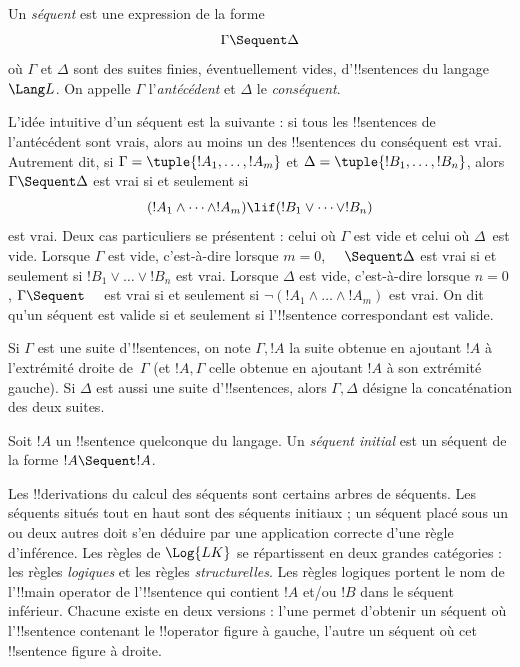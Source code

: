 \documentclass[11pt,a4paper,openany]{memoir}
\begin{document}
\begin{defn}[Séquent]
Un \emph{séquent} est une expression de la forme
\[
\Gamma \Sequent \Delta
\]
où $\Gamma$ et $\Delta$ sont des suites finies, éventuellement vides,
d'!!{sentence}s du langage $\Lang L$. On appelle $\Gamma$
l'\emph{antécédent} et $\Delta$ le \emph{conséquent}.
\end{defn}

\begin{explain}
L'idée intuitive d'un séquent est la suivante : si tous les
!!{sentence}s de l'antécédent sont vrais, alors au moins un des
!!{sentence}s du conséquent est vrai. Autrement dit, si
$\Gamma = \tuple{!A_1, \dots, !A_m}$ et
$\Delta = \tuple{!B_1, \dots, !B_n}$, alors
$\Gamma \Sequent \Delta$ est vrai si et seulement si
\[
(!A_1 \land \cdots \land !A_m) \lif (!B_1 \lor \cdots \lor
!B_n)
\]
est vrai. Deux cas particuliers se présentent : celui où $\Gamma$
est vide et celui où $\Delta$~est vide. Lorsque $\Gamma$ est vide,
c'est-à-dire lorsque $m = 0$, $\quad \Sequent \Delta$ est vrai si et
seulement si $!B_1 \lor \dots \lor !B_n$ est vrai. Lorsque $\Delta$
est vide, c'est-à-dire lorsque $n = 0$, $\Gamma \Sequent \quad$ est
vrai si et seulement si $\lnot(!A_1 \land \dots \land !A_m)$ est vrai.
On dit qu'un séquent est valide si et seulement si l'!!{sentence}
correspondant est valide.
\end{explain}

Si $\Gamma$ est une suite d'!!{sentence}s, on note $\Gamma, !A$
la suite obtenue en ajoutant $!A$ à l'extrémité droite de~$\Gamma$
(et $!A, \Gamma$ celle obtenue en ajoutant $!A$ à son extrémité
gauche). Si $\Delta$ est aussi une suite d'!!{sentence}s, alors
$\Gamma, \Delta$ désigne la concaténation des deux suites.

\begin{defn}
Soit $!A$ un !!{sentence} quelconque du langage.
Un \emph{séquent initial} est un séquent
{de la forme $!A \Sequent !A$.}
\end{defn}

Les !!{derivation}s du calcul des séquents sont certains arbres de
séquents. Les séquents situés tout en haut sont des séquents initiaux ;
un séquent placé sous un ou deux autres doit s'en déduire par une
application correcte d'une règle d'inférence. Les règles de
$\Log{LK}$ se répartissent en deux grandes catégories : les règles
\emph{logiques} et les règles \emph{structurelles}. Les règles
logiques portent le nom de l'!!{main operator} de l'!!{sentence} qui
contient $!A$ et/ou $!B$ dans le séquent inférieur. Chacune existe
en deux versions : l'une permet d'obtenir un séquent où
l'!!{sentence} contenant le !!{operator} figure à gauche, l'autre
un séquent où cet !!{sentence} figure à droite.
\end{document}
